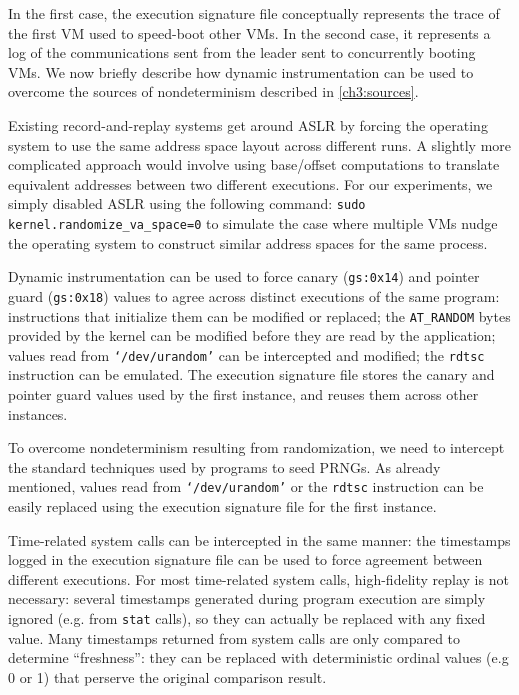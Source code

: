 In the first case, the execution signature file
conceptually represents the trace of the first VM used to speed-boot
other VMs. In the second case, it represents a log of the communications 
sent from the leader sent to concurrently booting VMs.
We now briefly describe how dynamic instrumentation can be used to overcome
the sources of nondeterminism described in \ref{ch3:sources}. \newline

 \newline
Existing record-and-replay systems get around ASLR by
forcing the operating system to use the same address space layout across
different runs. A slightly more complicated approach would involve
using base/offset computations to translate equivalent 
addresses between two different executions. 
For our experiments, we simply disabled ASLR using the following command:
\texttt {sudo kernel.randomize\_va\_space=0} to simulate the 
case where multiple VMs nudge the operating system to construct
similar address spaces for the same process. \newline

 \newline
Dynamic instrumentation can be used to force canary (\texttt{gs:0x14})
and pointer guard (\texttt{gs:0x18}) values
to agree across distinct executions of the same program:
instructions that initialize them can be
modified or replaced; the \texttt{AT\_RANDOM} bytes 
provided by the kernel can be
modified before they are read by the application; 
values read from \texttt{`/dev/urandom'} can be 
intercepted and modified; the \texttt{rdtsc} instruction can be emulated.
The execution signature file stores the canary and pointer guard values used by the first instance, 
and reuses them across other instances. \newline

 \newline
To overcome nondeterminism resulting from randomization,
we need to intercept the standard techniques
used by programs to seed PRNGs.
As already mentioned, values read from \texttt{`/dev/urandom'}
or the \texttt{rdtsc} instruction can be easily replaced
using the execution signature file for the first instance.

Time-related system calls can
be intercepted in the same manner:
the timestamps logged
in the execution signature file
can be used to force agreement
between different executions.
For most time-related system calls,
high-fidelity replay is not necessary:
several timestamps generated
during program execution are simply ignored
(e.g. from \texttt{stat} calls),
so they can actually be replaced with any 
fixed value. Many timestamps
returned from system calls are only compared to
determine ``freshness'': they
can be replaced with deterministic ordinal values (e.g 0 or 1) that 
perserve the original comparison result.

